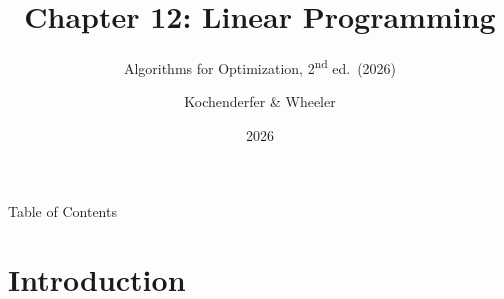 \documentclass[aspectratio=169,10pt]{beamer}
\title[Chapter 12: Linear Programming]{Chapter 12: Linear Programming}
\subtitle{Algorithms for Optimization, 2\textsuperscript{nd} ed.\ (2026)}
\author{Kochenderfer \& Wheeler}
\date{2026}
\begin{document}

\begin{frame}
  \titlepage
\end{frame}

\begin{frame}{Table of Contents}
  \tableofcontents
\end{frame}

\section{Introduction}
\end{document}
